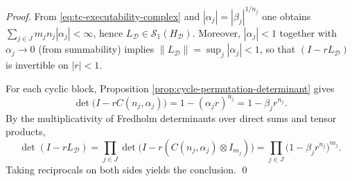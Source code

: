 \begin{proof}
From \eqref{eq:tc-executability-complex} and \(|\alpha_j|=|\beta_j|^{1/n_j}\) one obtains
\(
\sum_{j\in J}m_jn_j|\alpha_j|<\infty
\), hence \(L_{\mathcal D}\in\mathcal{S}_1(H_{\mathcal D})\).
Moreover, \(|\alpha_j|<1\) together with \(\alpha_j\to 0\) (from summability) implies \(\|L_{\mathcal D}\|=\sup_j|\alpha_j|<1\), so that \((I-rL_{\mathcal D})\) is invertible on \(|r|<1\).
\par
For each cyclic block, Proposition \ref{prop:cycle-permutation-determinant} gives
\[
\det\bigl(I-rC(n_j,\alpha_j)\bigr)=1-(\alpha_j r)^{n_j}=1-\beta_j r^{n_j}.
\]
By the multiplicativity of Fredholm determinants over direct sums and tensor products,
\[
\det(I-rL_{\mathcal D})
=\prod_{j\in J}\det\bigl(I-r(C(n_j,\alpha_j)\otimes I_{m_j})\bigr)
=\prod_{j\in J}\bigl(1-\beta_j r^{n_j}\bigr)^{m_j}.
\]
Taking reciprocals on both sides yields the conclusion. \qed
\end{proof}

\endinput

